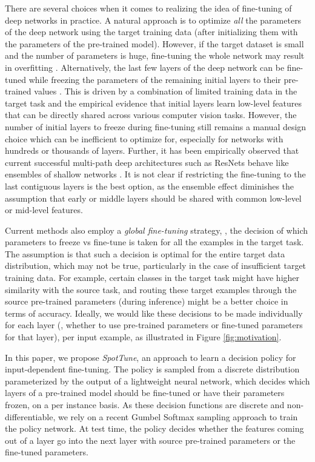 \documentclass[10pt,twocolumn,letterpaper]{article}
\begin{document}
There are several choices when it comes to realizing the idea of fine-tuning of deep networks in practice. A natural approach is to optimize \emph{all} the parameters of the deep network using the target training data (after initializing them with the parameters of the pre-trained model). However, if the target dataset is small and the number of parameters is huge, fine-tuning the whole network may result in overfitting \cite{yosinski2014transferable}. Alternatively, the last few layers of the deep network can be fine-tuned while freezing the parameters of the remaining initial layers to their pre-trained values \cite{tajbakhsh2016convolutional, azizpour2016factors}. This is driven by a combination of limited training data in the target task and the empirical evidence that initial layers learn low-level features that can be directly shared across various computer vision tasks. However, the number of initial layers to freeze during fine-tuning still remains a manual design choice which can be inefficient to optimize for, especially for networks with hundreds or thousands of layers. Further, it has been empirically observed that current successful multi-path deep architectures such as ResNets \cite{he2016deep} behave like ensembles of shallow networks \cite{veit2016residual}. It is not clear if restricting the fine-tuning to the last contiguous layers is the best option, as the ensemble effect diminishes the assumption that early or middle layers should be shared with common low-level or mid-level features.


Current methods also employ a \emph{global fine-tuning} strategy, \ie, the decision of which parameters to freeze vs fine-tune is taken for all the examples in the target task. 
The assumption is that such a decision is optimal for the entire target data distribution, which may not be true, particularly in the case of insufficient target training data. 
For example, certain classes in the target task might have higher similarity with the source task, and routing these target examples through the source pre-trained parameters (during inference) might be a better choice in terms of accuracy. Ideally, we would like these decisions to be made individually for each layer (\ie, whether to use pre-trained parameters or fine-tuned parameters for that layer), per input example, as illustrated in Figure \ref{fig:motivation}.


In this paper, we propose \emph{SpotTune}, an approach to learn a decision policy for input-dependent fine-tuning. 
The policy is sampled from a discrete distribution parameterized by the output of a lightweight neural network, which decides which layers of a pre-trained model should be fine-tuned or have their parameters frozen, on a per instance basis. As these decision functions are discrete and non-differentiable, we rely on a recent Gumbel Softmax sampling approach \cite{maddison2016concrete,jang2016categorical} to train the policy network. At test time, the policy decides whether the features coming out of a layer go into the next layer with source pre-trained parameters or the fine-tuned parameters.
\end{document}
